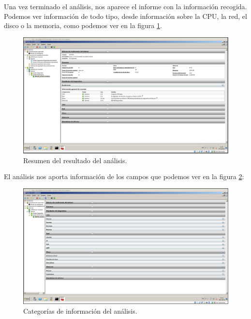\documentclass[a4paper,titlepage,12pt]{scrartcl}	%
\numberwithin{figure}{section} %
\numberwithin{table}{section} %
\begin{document}
	Una vez terminado el análisis, nos aparece el informe con la información recogida. Podemos ver información de todo tipo, desde información sobre la CPU, la red, el disco o la memoria, como podemos ver en la figura \ref{4-resumen}.
	
	\begin{figure}[H]
		\includegraphics[width=\linewidth]{./Imagenes/4-resumen.png}
		\vspace{-0.5cm}
		\caption[Resumen del resultado del análisis.]{Resumen del resultado del análisis.}
		\label{4-resumen}
	\end{figure}
	
	El análisis nos aporta información de los campos que podemos ver en la figura \ref{4-categorias}:
	
	\begin{figure}[H]
		\includegraphics[width=\linewidth]{./Imagenes/4-categorias.png}
		\vspace{-0.5cm}
		\caption[Categorías de información del análisis.]{Categorías de información del análisis.}
		\label{4-categorias}
	\end{figure}
	
\end{document}
